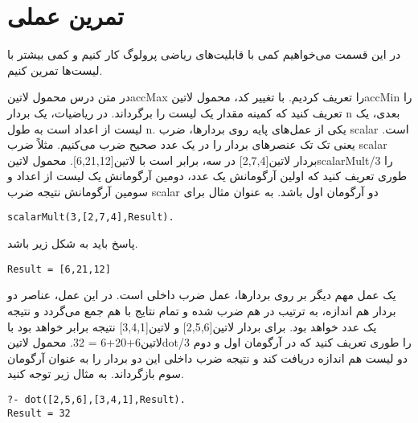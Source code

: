 \section{تمرین عملی}
در این قسمت می‌خواهیم کمی با قابلیت‌های ریاضی پرولوگ کار کنیم و کمی بیشتر با لیست‌ها تمرین کنیم.

\begin{enumerate}
 در متن درس محمول ‌لاتین{accMax} را تعریف کردیم. با تغییر کد، محمول ‌لاتین{accMin} را تعریف کنید که کمینه مقدار یک لیست را برگرداند.
 در ریاضیات، یک بردار n‌ بعدی، یک لیست از اعداد است به طول n. یکی از عمل‌های پایه روی بردارها، ضرب scalar است. یعنی تک تک عنصرهای بردار را در یک عدد صحیح ضرب می‌کنیم. مثلاً ضرب scalar بردار ‌لاتین{[2,7,4]} در سه، برابر است با ‌لاتین{[6,21,12]}. محمول ‌لاتین{scalarMult/3} را طوری تعریف کنید که اولین آرگومانش یک عدد، دومین آرگومانش یک لیست از اعداد و سومین آرگومانش نتیجه ضرب scalar دو آرگومان اول باشد. به عنوان مثال برای
\begin{latin}
\begin{lstlisting}
scalarMult(3,[2,7,4],Result).
\end{lstlisting}
\end{latin}

پاسخ باید به شکل زیر باشد.

\begin{latin}
\begin{lstlisting}
Result = [6,21,12]
\end{lstlisting}
\end{latin}

 یک عمل مهم دیگر بر روی بردارها، عمل ضرب داخلی است. در این عمل، عناصر دو بردار هم اندازه، به ترتیب در هم ضرب شده و تمام نتایج با هم جمع می‌گردد و نتیجه یک عدد خواهد بود. برای بردار ‌لاتین{[2,5,6]} و ‌لاتین{[3,4,1]} نتیجه برابر خواهد بود با ‌لاتین{6+20+6 = 32}. محمول ‌لاتین{dot/3} را طوری تعریف کنید که در آرگومان اول و دوم دو لیست هم اندازه دریافت کند و نتیجه ضرب داخلی این دو بردار را به عنوان آرگومان سوم بازگرداند. به مثال زیر توجه کنید.
\begin{latin}
\begin{lstlisting}
?- dot([2,5,6],[3,4,1],Result).
Result = 32
\end{lstlisting}
\end{latin}

\end{enumerate}